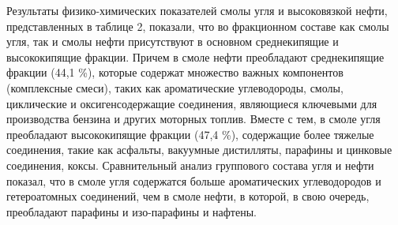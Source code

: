 
\begin{multicols}{2}
Результаты физико-химических показателей смолы угля и высоковязкой
нефти, представленных в таблице 2, показали, что во фракционном составе
как смолы угля, так и смолы нефти присутствуют в основном среднекипящие
и высококипящие фракции. Причем в смоле нефти преобладают среднекипящие
фракции (44,1 \%), которые содержат множество важных компонентов
(комплексные смеси), таких как ароматические углеводороды, смолы,
циклические и оксигенсодержащие соединения, являющиеся ключевыми для
производства бензина и других моторных топлив. Вместе с тем, в смоле
угля преобладают высококипящие фракции (47,4 \%), содержащие более
тяжелые соединения, такие как асфальты, вакуумные дистилляты, парафины и
цинковые соединения, коксы. Сравнительный анализ группового состава угля
и нефти показал, что в смоле угля содержатся больше ароматических
углеводородов и гетероатомных соединений, чем в смоле нефти, в которой,
в свою очередь, преобладают парафины и изо-парафины и нафтены.
\end{multicols}

